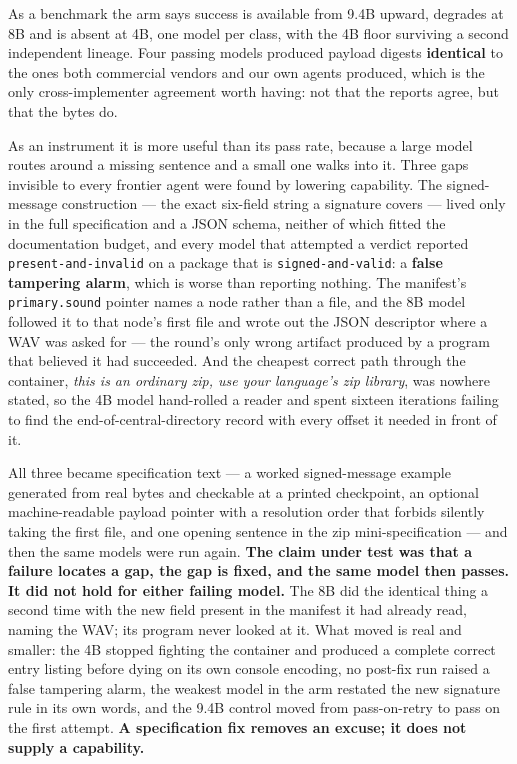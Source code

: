 \documentclass[10pt,twocolumn,letterpaper]{article}
\newcommand{\code}[1]{\texttt{\small #1}}
\begin{document}
As a benchmark the arm says success is available from 9.4B upward, degrades at 8B and is absent at 4B, one model per class, with the 4B floor surviving a second independent lineage. Four passing models produced payload digests \textbf{identical} to the ones both commercial vendors and our own agents produced, which is the only cross-implementer agreement worth having: not that the reports agree, but that the bytes do.

As an instrument it is more useful than its pass rate, because a large model routes around a missing sentence and a small one walks into it. Three gaps invisible to every frontier agent were found by lowering capability. The signed-message construction --- the exact six-field string a signature covers --- lived only in the full specification and a JSON schema, neither of which fitted the documentation budget, and every model that attempted a verdict reported \code{present-and-invalid} on a package that is \code{signed-and-valid}: a \textbf{false tampering alarm}, which is worse than reporting nothing. The manifest's \code{primary.sound} pointer names a node rather than a file, and the 8B model followed it to that node's first file and wrote out the JSON descriptor where a WAV was asked for --- the round's only wrong artifact produced by a program that believed it had succeeded. And the cheapest correct path through the container, \emph{this is an ordinary zip, use your language's zip library}, was nowhere stated, so the 4B model hand-rolled a reader and spent sixteen iterations failing to find the end-of-central-directory record with every offset it needed in front of it.

All three became specification text --- a worked signed-message example generated from real bytes and checkable at a printed checkpoint, an optional machine-readable payload pointer with a resolution order that forbids silently taking the first file, and one opening sentence in the zip mini-specification --- and then the same models were run again. \textbf{The claim under test was that a failure locates a gap, the gap is fixed, and the same model then passes. It did not hold for either failing model.} The 8B did the identical thing a second time with the new field present in the manifest it had already read, naming the WAV; its program never looked at it. What moved is real and smaller: the 4B stopped fighting the container and produced a complete correct entry listing before dying on its own console encoding, no post-fix run raised a false tampering alarm, the weakest model in the arm restated the new signature rule in its own words, and the 9.4B control moved from pass-on-retry to pass on the first attempt. \textbf{A specification fix removes an excuse; it does not supply a capability.}
\end{document}
